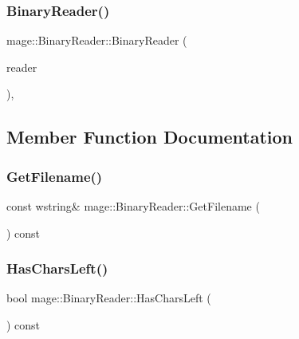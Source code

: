\hypertarget{classmage_1_1_binary_reader_ac8f3141f7ce5da9cd1890b4a61edf0a3}{}\label{classmage_1_1_binary_reader_ac8f3141f7ce5da9cd1890b4a61edf0a3} 
\subsubsection{\texorpdfstring{Binary\+Reader()}{BinaryReader()}\hspace{0.1cm}{\footnotesize\ttfamily [3/3]}}
{\footnotesize\ttfamily mage\+::\+Binary\+Reader\+::\+Binary\+Reader (\begin{DoxyParamCaption}\item[{\hyperlink{classmage_1_1_binary_reader}{Binary\+Reader} \&\&}]{reader }\end{DoxyParamCaption})\hspace{0.3cm}{\ttfamily [private]}, {\ttfamily [delete]}}



\subsection{Member Function Documentation}
\hypertarget{classmage_1_1_binary_reader_a10a0ec56fe7f8e63964ffca2afe019a3}{}\label{classmage_1_1_binary_reader_a10a0ec56fe7f8e63964ffca2afe019a3} 
\subsubsection{\texorpdfstring{Get\+Filename()}{GetFilename()}}
{\footnotesize\ttfamily const wstring\& mage\+::\+Binary\+Reader\+::\+Get\+Filename (\begin{DoxyParamCaption}{ }\end{DoxyParamCaption}) const}

\hypertarget{classmage_1_1_binary_reader_a35b10713dca7a416b73b28d5f6aaf600}{}\label{classmage_1_1_binary_reader_a35b10713dca7a416b73b28d5f6aaf600} 
\subsubsection{\texorpdfstring{Has\+Chars\+Left()}{HasCharsLeft()}}
{\footnotesize\ttfamily bool mage\+::\+Binary\+Reader\+::\+Has\+Chars\+Left (\begin{DoxyParamCaption}{ }\end{DoxyParamCaption}) const\hspace{0.3cm}{\ttfamily [protected]}}

